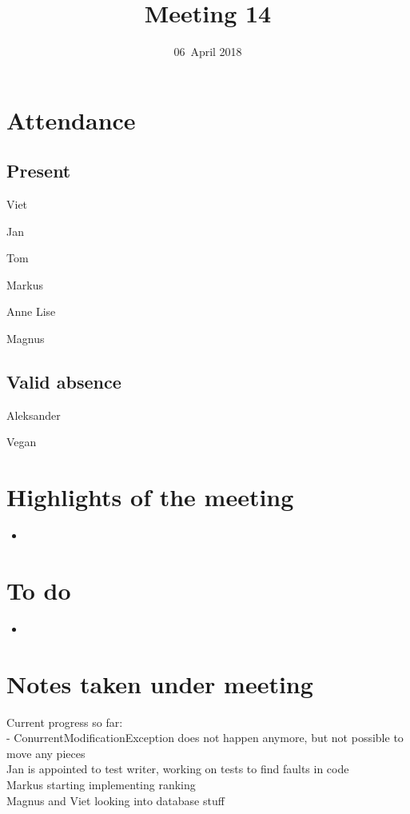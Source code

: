 \documentclass[letterpaper,11pt]{article}
\title{Meeting 14}
\date{06~April 2018}
\begin{document}
\maketitle
\section*{Attendance}
\subsection*{Present}
\begin{list}{}{}
	\item Viet
	\item Jan
	\item Tom
	\item Markus
	\item Anne Lise
	\item Magnus
\end{list}

\subsection*{Valid absence}
\begin{list}{}{}
	\item Aleksander
	\item Vegan
\end{list}

\newpage
\section*{Highlights of the meeting}
\begin{itemize}
	\item
\end{itemize}

\section*{To do}
\begin{itemize}
	\item
\end{itemize}

\section*{Notes taken under meeting}
Current progress so far:\\
- ConurrentModificationException does not happen anymore, but not possible to move any pieces\\
Jan is appointed to test writer, working on tests to find faults in code\\
Markus starting implementing ranking\\
Magnus and Viet looking into database stuff\\
\end{document}
